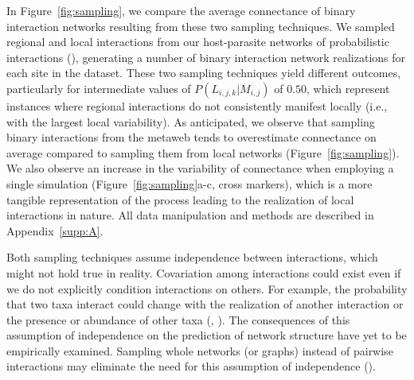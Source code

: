\begin{box2.5}
In Figure~\ref{fig:sampling}, we compare the average connectance of binary
interaction networks resulting from these two sampling techniques. We sampled
regional and local interactions from our host-parasite networks of probabilistic
interactions (\cite{Kopelke2017Foodweb}), generating a number of binary
interaction network realizations for each site in the dataset. These two
sampling techniques yield different outcomes, particularly for intermediate
values of $P(L_{i, j, k}|M_{i, j})$ of $0.50$, which represent instances where
regional interactions do not consistently manifest locally (i.e., with the
largest local variability). As anticipated, we observe that sampling binary
interactions from the metaweb tends to overestimate connectance on average
compared to sampling them from local networks (Figure~\ref{fig:sampling}). We also
observe an increase in the variability of connectance when employing a single
simulation (Figure~\ref{fig:sampling}a-c, cross markers), which is a more tangible
representation of the process leading to the realization of local interactions
in nature. All data manipulation and methods are described in
Appendix~\ref{supp:A}.

Both sampling techniques assume independence between interactions, which might
not hold true in reality. Covariation among interactions could exist even if we
do not explicitly condition interactions on others. For example, the probability
that two taxa interact could change with the realization of another interaction
or the presence or abundance of other taxa (\cite{Pilosof2017Multilayer},
\cite{Kefi2012More}). The consequences of this assumption of independence on the
prediction of network structure have yet to be empirically examined. Sampling
whole networks (or graphs) instead of pairwise interactions may eliminate the
need for this assumption of independence (\cite{Battiston2020Networks}).

\clearpage


\end{box2.5}
